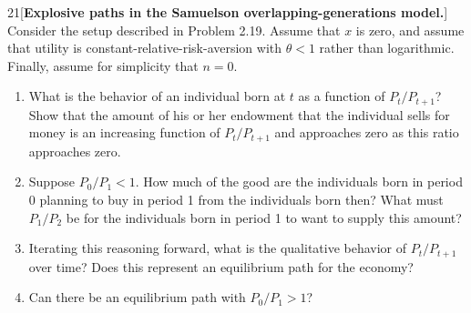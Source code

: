 \begin{problem}{21}[\textbf{Explosive paths in the Samuelson overlapping-generations model.}]
Consider the setup described in Problem 2.19. Assume that \(x\) is zero, and assume that utility is constant-relative-risk-aversion with \(\theta<1\) rather than logarithmic. Finally, assume for simplicity that \(n=0\).
\begin{enumerate}[label=(\alph*)]
    \item What is the behavior of an individual born at \(t\) as a function of \(P_t/P_{t+1}\)? Show that the amount of his or her endowment that the individual sells for money is an increasing function of \(P_t/P_{t+1}\) and approaches zero as this ratio approaches zero.
    \item Suppose \(P_0/P_1<1\). How much of the good are the individuals born in period 0 planning to buy in period 1 from the individuals born then? What must \(P_1/P_2\) be for the individuals born in period 1 to want to supply this amount?
    \item Iterating this reasoning forward, what is the qualitative behavior of \(P_t/P_{t+1}\) over time? Does this represent an equilibrium path for the economy?
    \item Can there be an equilibrium path with \(P_0/P_1>1\)?
\end{enumerate}
\end{problem}

